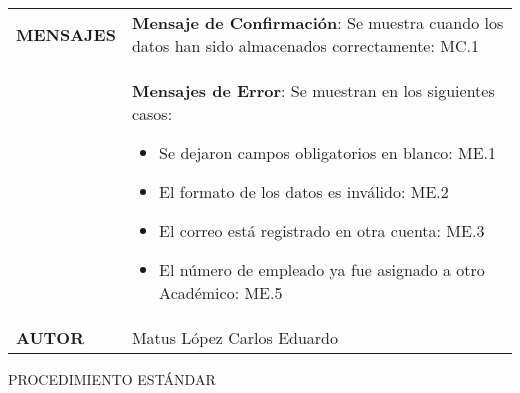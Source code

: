 \newpage
\begin{longtable}{ | p{6cm} | p{10cm} |}
\hline
\textbf{MENSAJES} & \textbf{Mensaje de Confirmación}: Se muestra cuando los datos han sido almacenados correctamente: MC.1\\&\textbf{Mensajes de Error}: Se muestran en los siguientes casos:\begin{itemize}
    \item Se dejaron campos obligatorios en blanco: ME.1
    \item El formato de los datos es inválido: ME.2
    \item El correo está registrado en otra cuenta: ME.3
    \item El número de empleado ya fue asignado a otro Académico: ME.5
\end{itemize}\\
\hline
\textbf{AUTOR} & Matus López Carlos Eduardo\\
\hline
\end{longtable}
\vspace*{1cm}
\noindent
\Large{PROCEDIMIENTO ESTÁNDAR}
\large{}

